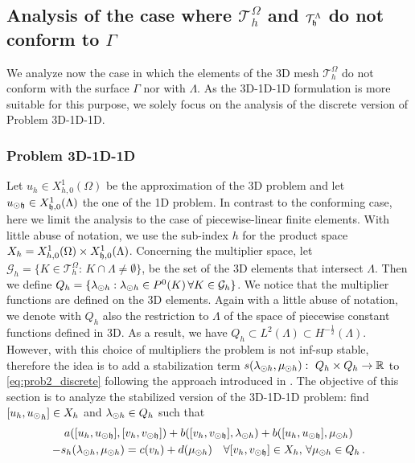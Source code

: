 \documentclass[r]{siamart171218}
\begin{document}
\def\patch{\omega _j}
\subsection{Analysis of the case where $\mathcal{T}^{\Omega}_h$ and $\mathcal{T}^{\Lambda}_{\mathfrak{h}}$ do not conform to $\Gamma$} \label{sec:unfit2}
We analyze now the case in which the elements of the 3D mesh $\mathcal{T}^{\Omega}_h$
do not conform with the surface $\Gamma$ nor with $\Lambda$. 
As the 3D-1D-1D formulation is more suitable for this purpose,
we solely focus on the analysis of the discrete version of Problem 3D-1D-1D.

\subsubsection{Problem 3D-1D-1D} 
Let $u_h \in X_{h,0}^1(\Omega)$ be the approximation of the 3D problem
and let $u_{\odot \mathfrak{h}} \in X_{\mathfrak{h},0}^1(\Lambda)$ the one of the 1D problem.
In contrast to the conforming case, 
here we limit the analysis to the case of piecewise-linear finite elements. 
With little abuse of notation, we use the sub-index $h$ for the product space 
$X_h = X_{h,0}^1(\Omega) \times X_{\mathfrak{h},0}^1(\Lambda)$.
Concerning the multiplier space, let $\mathcal{G}_h = \{K \in \mathcal{T}^{\Omega}_h: \, K\cap \Lambda \neq \emptyset\}$, be the set of the 3D elements that intersect $\Lambda$. Then we define $Q_h=\{\lambda_{\odot h} : \lambda_{\odot h} \in P^0(K) \, \forall K \in \mathcal{G}_h\}$. We notice that the multiplier functions are defined on the 3D elements. Again with a little abuse of notation, we denote with $Q_h$ also the restriction to $\Lambda$ of the space of piecewise constant functions defined in 3D. As a result, we have $Q_h \subset L^2(\Lambda) \subset H^{-\frac12}(\Lambda)$.
However, with this choice of multipliers the problem is not inf-sup stable, therefore the idea is to add a stabilization term $s(\lambda_{\odot h}, \mu_{\odot h}): \ Q_h \times Q_h \rightarrow \mathbb{R}$ to \eqref{eq:prob2_discrete} following the approach introduced in \cite{burman2014}. 
The objective of this section is to analyze the stabilized version of the 3D-1D-1D problem: find $[u_h, {u_{\odot}}_h] \in X_h$ and $\lambda_{\odot h} \in Q_h$ such that
\begin{multline}\label{eq:prob2_stabilized}
a([u_h, \udfh], [v_h, \vdfh]) +
b([v_h, \vdfh], \ldh)
+ b([u_h, \udfh], \mdh)
\\
- s_h(\ldh, \mdh) 
= c(v_h) + d(\mdh)
  \quad \forall [v_h, \vdfh] \in X_h, \,
  \forall \mdh \in Q_h\,.
\end{multline}
\end{document}
